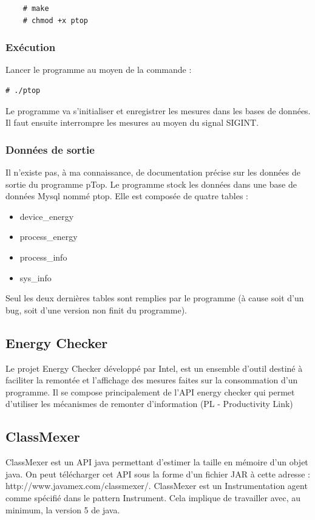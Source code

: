 \documentclass[a4paper, 11pt]{report}
\begin{document}
\begin{verbatim}
	# make
	# chmod +x ptop
\end{verbatim}

\subsubsection{Exécution}
Lancer le programme au moyen de la commande :

\begin{verbatim}
# ./ptop
\end{verbatim}

Le programme va s'initialiser et enregistrer les mesures dans les bases de données. Il faut ensuite interrompre les mesures au moyen du signal SIGINT.

\subsubsection{Données de sortie}
Il n’existe pas, à ma connaissance, de documentation précise sur les données de sortie du programme pTop.  Le programme stock les données dans une base de données Mysql nommé ptop. Elle est composée de quatre tables :
\begin{itemize}
	\item device\_energy
	\item process\_energy
	\item process\_info
	\item sys\_info
\end{itemize}

Seul les deux dernières tables sont remplies par le programme (à cause soit d’un bug, soit d’une version non finit du programme).

\subsection{Energy Checker}
Le projet Energy Checker développé par Intel, est un ensemble d’outil destiné à faciliter la remontée et l’affichage des mesures faites sur la consommation d’un programme. Il se compose principalement de l’API energy checker qui permet d’utiliser les mécanismes de remonter d’information (PL - Productivity Link)

\subsection{ClassMexer}
ClassMexer est un API java permettant d’estimer la taille en mémoire d’un objet java. On peut télécharger cet API sous la forme d’un fichier JAR à cette adresse : http://www.javamex.com/classmexer/. ClassMexer est un Instrumentation agent comme spécifié dans le pattern Instrument. Cela implique de travailler avec, au minimum, la version 5 de java.
\end{document}

